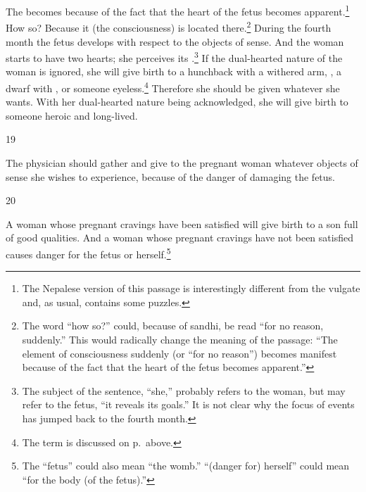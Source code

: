 \begin{translation}
The  becomes
 because of the fact that the heart of the
fetus becomes apparent.\footnote{The Nepalese version of this passage
    is interestingly different from the vulgate and, as usual, contains
    some puzzles.}   How so?  Because it (the consciousness) is located
    there.\footnote{The word  “how so?” could, because of
        sandhi, be read  “for no reason, suddenly.”  This would
        radically change the meaning of the passage: “The element of
        consciousness suddenly (or “for no reason”) becomes manifest because
        of the fact that the heart of the fetus becomes apparent.”} During the
        fourth month the fetus develops  with
        respect to the objects of sense. And the woman starts to have two
        hearts; she perceives its .\footnote{The subject
            of the sentence, “she,” probably refers to the woman, but may refer to
            the fetus, “it reveals its goals.”  It is not clear why the focus of
            events has jumped back to the fourth month.} If the dual-hearted
            nature of the woman is ignored, she will give birth to a hunchback
            with a withered arm, , a dwarf with
            , or someone eyeless.\footnote{The
                term  is discussed on p.\,\pageref{ṣaṇḍha} above.}
                Therefore she should be given whatever she wants. With her
                dual-hearted nature being acknowledged, she will give birth to someone
                heroic and long-lived.
        

\item[19]

The physician should gather and give to the pregnant woman whatever objects of 
sense she wishes to experience, because of the danger of damaging the fetus. 

\item [20]

A woman whose pregnant cravings have been satisfied will give birth to
a son full of good qualities.  And a woman whose pregnant cravings
have not been satisfied causes danger for the fetus or
herself.\footnote{The  “fetus” could also mean “the womb.”
     “(danger for) herself” could mean “for the body (of the
    fetus).”}
    

\bigskip



\end{translation}
